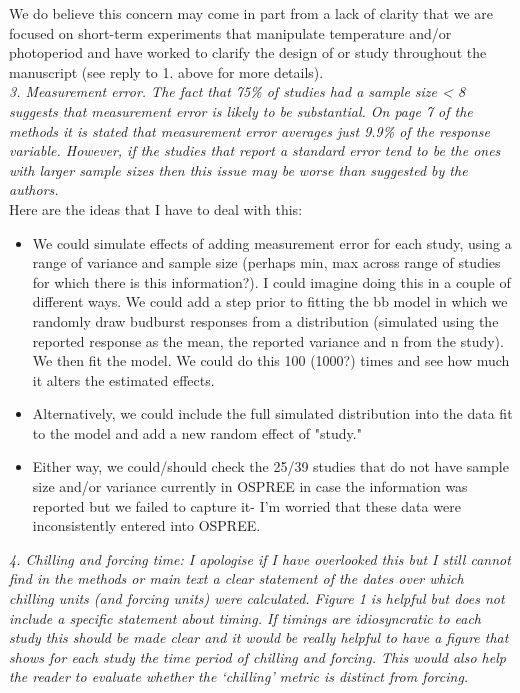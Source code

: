 \documentclass[11pt, a4paper]{article}
\begin{document}
We do believe this concern may come in part from a lack of clarity that we are focused on short-term experiments that manipulate temperature and/or photoperiod and have worked to clarify the design of or study throughout the manuscript (see reply to 1. above for more details).\\

\emph{3. Measurement error. The fact that 75\% of studies had a sample size < 8 suggests that
measurement error is likely to be substantial. On page 7 of the methods it is stated that
measurement error averages just 9.9\% of the response variable. However, if the studies that
report a standard error tend to be the ones with larger sample sizes then this issue may be
worse than suggested by the authors.}\\

Here are the ideas that I have to deal with this:
\begin{itemize}
\item  We could simulate effects of adding measurement error for each study, using a range of variance and sample size (perhaps min, max across range of studies for which there is this information?). I could imagine doing this in a couple of different ways. We could add a step prior to fitting the bb model in which we randomly draw budburst responses from a distribution (simulated using the reported response as the mean, the reported variance and n from the study). We then fit the model. We could do this 100 (1000?) times and see how much it alters the estimated effects. 
\item Alternatively, we could include the full simulated distribution into the data fit to the model and add a new random effect of "study."  
\item Either way, we could/should check the 25/39 studies that do not have sample size and/or variance currently in OSPREE in case the information was reported but we failed to capture it- I'm worried that these data were inconsistently entered into OSPREE. 
\end{itemize}

\emph{4. Chilling and forcing time: I apologise if I have overlooked this but I still cannot find in the
methods or main text a clear statement of the dates over which chilling units (and forcing
units) were calculated. Figure 1 is helpful but does not include a specific statement about
timing. If timings are idiosyncratic to each study this should be made clear and it would be
really helpful to have a figure that shows for each study the time period of chilling and forcing.
This would also help the reader to evaluate whether the `chilling' metric is distinct from
forcing.}\\
\end{document}

